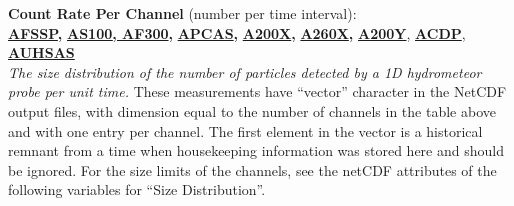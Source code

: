 \begin{hangparagraphs}
\textbf{Count Rate Per Channel }(number per time interval):\textbf{\uline{\label{punch:5-4}\label{punch:5-7}}}\\
\textbf{\uline{AFSSP}}\textbf{,
}\textbf{\uline{AS100}}\textbf{\uline{,
AF300}}\textbf{, }\textbf{\uline{APCAS}}\textbf{,
}\textbf{\uline{A200X}}\textbf{,
}\textbf{\uline{A260X}}\textbf{,
}\textbf{\uline{A200Y}}, \textbf{\uline{ACDP}},
\textbf{\uline{AUHSAS}}\\
\emph{The size distribution of the number of particles detected by
a 1D hydrometeor probe per unit time.} These measurements have ``vector''
character in the NetCDF output files, with dimension
equal to the number of channels in the table above and with one entry
per channel. The first element in the vector is a historical remnant
from a time when housekeeping information was stored here and should
be ignored. For the size limits of the channels, see the netCDF attributes
of the following variables for ``Size Distribution''.


\end{hangparagraphs}
